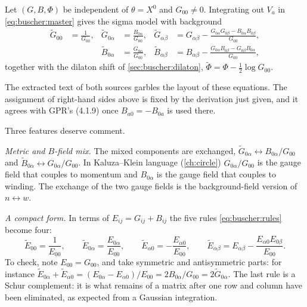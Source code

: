 \begin{theorem}\label{thm:buscher:rules}
Let $(G,B,\Phi)$ be independent of $\theta=X^0$ and $G_{00}\neq0$. Integrating out $V_a$ in
\eqref{eq:buscher:master} gives the sigma model with background
\begin{equation}\label{eq:buscher:rules}
\begin{aligned}
 \tilde G_{00}&=\frac{1}{G_{00}}, &
 \tilde G_{0\alpha}&=\frac{B_{0\alpha}}{G_{00}}, &
 \tilde G_{\alpha\beta}&=G_{\alpha\beta}
   -\frac{G_{0\alpha}G_{0\beta}-B_{0\alpha}B_{0\beta}}{G_{00}},\\
 && \tilde B_{0\alpha}&=\frac{G_{0\alpha}}{G_{00}}, &
 \tilde B_{\alpha\beta}&=B_{\alpha\beta}
   -\frac{G_{0\alpha}B_{0\beta}-G_{0\beta}B_{0\alpha}}{G_{00}},
\end{aligned}
\end{equation}
together with the dilaton shift of \cref{sec:buscher:dilaton},
$\tilde\Phi=\Phi-\tfrac12\log G_{00}$. \TL\
\end{theorem}

The extracted text of both sources garbles the layout of these equations. The assignment of
right-hand sides above is fixed by the derivation just given, and it agrees with GPR's
(4.1.9) once $B_{a0}=-B_{0a}$ is used there.

Three features deserve comment.

\emph{Metric and $B$-field mix.} The mixed components are exchanged,
$\tilde G_{0\alpha}\leftrightarrow B_{0\alpha}/G_{00}$ and
$\tilde B_{0\alpha}\leftrightarrow G_{0\alpha}/G_{00}$. In Kaluza--Klein language
(\cref{ch:circle}) $G_{0\alpha}/G_{00}$ is the gauge field that couples to momentum and
$B_{0\alpha}$ is the gauge field that couples to winding. The exchange of the two gauge fields
is the background-field version of $n\leftrightarrow w$.

\emph{A compact form.} In terms of $E_{ij}=G_{ij}+B_{ij}$ the five rules
\eqref{eq:buscher:rules} become four:
\begin{equation}\label{eq:buscher:Erules}
 \tilde E_{00}=\frac{1}{E_{00}},\qquad
 \tilde E_{0\alpha}=\frac{E_{0\alpha}}{E_{00}},\qquad
 \tilde E_{\alpha0}=-\frac{E_{\alpha0}}{E_{00}},\qquad
 \tilde E_{\alpha\beta}=E_{\alpha\beta}-\frac{E_{\alpha0}E_{0\beta}}{E_{00}} .
\end{equation}
To check, note $E_{00}=G_{00}$, and take symmetric and antisymmetric parts: for instance
$\tilde E_{0\alpha}+\tilde E_{\alpha0}=(E_{0\alpha}-E_{\alpha0})/E_{00}=2B_{0\alpha}/G_{00}
=2\tilde G_{0\alpha}$. The last rule is a Schur complement\index{Schur complement}: it is what
remains of a matrix after one row and column have been eliminated, as expected from a
Gaussian integration.

